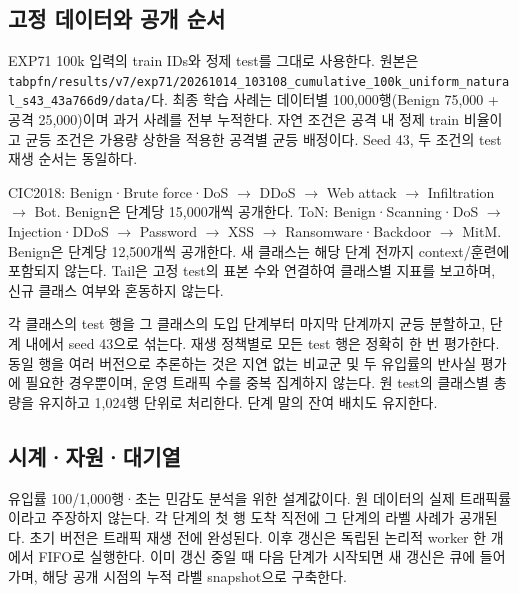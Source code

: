 \subsection{고정 데이터와 공개 순서}
EXP71 100k 입력의 train IDs와 정제 test를 그대로 사용한다. 원본은 \texttt{tabpfn/\allowbreak{}\allowbreak{}r\allowbreak{}esults/\allowbreak{}\allowbreak{}v\allowbreak{}7/\allowbreak{}\allowbreak{}exp71/\allowbreak{}\allowbreak{}20261014\allowbreak{}\_\allowbreak{}\allowbreak{}103108\_\allowbreak{}\allowbreak{}cumulati\allowbreak{}ve\_\allowbreak{}\allowbreak{}100k\_\allowbreak{}\allowbreak{}uniform\_\allowbreak{}\allowbreak{}natural\_\allowbreak{}\allowbreak{}s43\_\allowbreak{}\allowbreak{}43a7\allowbreak{}66d9/\allowbreak{}\allowbreak{}dat\allowbreak{}a/\allowbreak{}\allowbreak{}}다. 최종 학습 사례는 데이터별 100,000행(Benign 75,000 +\allowbreak{} 공격 25,000)이며 과거 사례를 전부 누적한다. 자연 조건은 공격 내 정제 train 비율이고 균등 조건은 가용량 상한을 적용한 공격별 균등 배정이다. Seed 43, 두 조건의 test 재생 순서는 동일하다.

CIC2018: Benign·Brute force·DoS  \ensuremath{\rightarrow}  DDoS  \ensuremath{\rightarrow}  Web attack  \ensuremath{\rightarrow}  Infiltration  \ensuremath{\rightarrow}  Bot. Benign은 단계당 15,000개씩 공개한다. ToN: Benign·Scanning·DoS  \ensuremath{\rightarrow}  Injection·DDoS  \ensuremath{\rightarrow}  Password  \ensuremath{\rightarrow}  XSS  \ensuremath{\rightarrow}  Ransomware·Backdoor  \ensuremath{\rightarrow}  MitM. Benign은 단계당 12,500개씩 공개한다. 새 클래스는 해당 단계 전까지 context/\allowbreak{}훈련에 포함되지 않는다. Tail은 고정 test의 표본 수와 연결하여 클래스별 지표를 보고하며, 신규 클래스 여부와 혼동하지 않는다.

각 클래스의 test 행을 그 클래스의 도입 단계부터 마지막 단계까지 균등 분할하고, 단계 내에서 seed 43으로 섞는다. 재생 정책별로 모든 test 행은 정확히 한 번 평가한다. 동일 행을 여러 버전으로 추론하는 것은 지연 없는 비교군 및 두 유입률의 반사실 평가에 필요한 경우뿐이며, 운영 트래픽 수를 중복 집계하지 않는다. 원 test의 클래스별 총량을 유지하고 1,024행 단위로 처리한다. 단계 말의 잔여 배치도 유지한다.

\subsection{시계·자원·대기열}
유입률 100/\allowbreak{}1,000행·초는 민감도 분석을 위한 설계값이다. 원 데이터의 실제 트래픽률이라고 주장하지 않는다. 각 단계의 첫 행 도착 직전에 그 단계의 라벨 사례가 공개된다. 초기 버전은 트래픽 재생 전에 완성된다. 이후 갱신은 독립된 논리적 worker 한 개에서 FIFO로 실행한다. 이미 갱신 중일 때 다음 단계가 시작되면 새 갱신은 큐에 들어가며, 해당 공개 시점의 누적 라벨 snapshot으로 구축한다.

